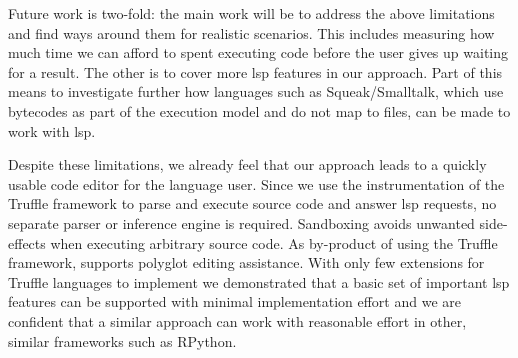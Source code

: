 \documentclass[sigplan,10pt,screen]{acmart}
\makeatletter
\renewcommand\subparagraph{\@startsection{subparagraph}{5}{\z@}%
   {-.2\baselineskip \@plus -2\p@ \@minus -.2\p@}%
   {-3.5\p@}%
   {\@subparfont\@addspaceafter}}
\makeatother
\begin{document}
{Future work is two-fold: the main work will be to address the above limitations
and find ways around them for realistic scenarios. This includes measuring how
much time we can afford to spent executing code before the user gives up waiting
for a result. The other is to cover more \ac{lsp} features in our approach. Part
of this means to investigate further how languages such as Squeak/Smalltalk, which use
bytecodes as part of the execution model and do not map to files, can be made to
work with \ac{lsp}.

Despite these limitations, we already feel that our approach leads to a quickly
usable code editor for the language user. Since we use the instrumentation \api
of the Truffle framework to parse and execute source code and answer \ac{lsp}
requests, no separate parser or inference engine is required. Sandboxing avoids
unwanted side-effects when executing arbitrary source code. As by-product of
using the Truffle framework, \graallsp supports polyglot editing
assistance. With only few \api extensions for Truffle languages to implement we
demonstrated that a basic set of important \ac{lsp} features can be supported
with minimal implementation effort and we are confident that a similar approach
can work with reasonable effort in other, similar frameworks such as RPython.




}
\end{document}
